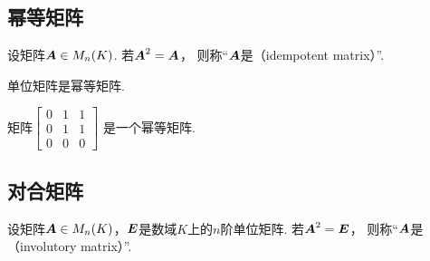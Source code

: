 \subsection{幂等矩阵}
\begin{definition}\label{definition:幂等矩阵.幂等矩阵的定义}
设矩阵\(\boldsymbol{A} \in M_n(K)\).
若\(\boldsymbol{A}^2=\boldsymbol{A}\)，
则称“\(\boldsymbol{A}\)是（idempotent matrix）”.
\end{definition}

\begin{example}
单位矩阵是幂等矩阵.
\end{example}

\begin{example}
矩阵\begin{math}
	\begin{bmatrix}
		0 & 1 & 1 \\
		0 & 1 & 1 \\
		0 & 0 & 0
	\end{bmatrix}
\end{math}
是一个幂等矩阵.
\end{example}

\subsection{对合矩阵}
\begin{definition}
设矩阵\(\boldsymbol{A} \in M_n(K)\)，\(\boldsymbol{E}\)是数域\(K\)上的\(n\)阶单位矩阵.
若\(\boldsymbol{A}^2=\boldsymbol{E}\)，
则称“\(\boldsymbol{A}\)是（involutory matrix）”.
\end{definition}

